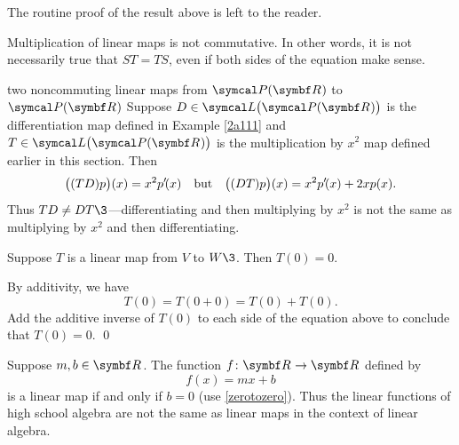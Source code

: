The routine proof of the result above is left to the reader.

Multiplication of linear maps is not commutative.  In other words, it is not
necessarily true that $ST = TS$, even if both sides of the equation make sense.

\begin{example}[3noncom]{two noncommuting linear maps from\/ $\P(\R{})$ to\/ $\P(\R{})$}
Suppose $D \in \L\bigl(\P(\R{})\bigr)$ is the differentiation map defined
in Example \ref{2a111} and $T \in \L\bigl(\P(\R{})\bigr)$ is the multiplication by
$x^2$ map defined earlier in this section. Then
\[
\bigl((TD)p\bigr)(x) = x^2 p' \! (x) \quad \text{but} \quad \bigl((DT)p\bigr)(x) = x^2 p' \! (x) + 2 x p(x).
\]
Thus $TD \ne DT\3$---differentiating and then multiplying by $x^2$ is not the same as multiplying by $x^2$ and then differentiating.
\end{example}

{Suppose $T$ is a linear map from $V$ to $W\3$. Then $T(0) = 0$.}

\proof
By additivity, we have
\[
T(0) = T(0 + 0) = T(0) + T(0).
\]
Add the additive inverse of $T(0)$ to each side of the equation above to conclude that $T(0) = 0$.
\qed

Suppose $m, b \in \R{}$. The function $\fun f {\R{}} {\R{}}$ defined by
\[
f(x) = mx + b
\]
is a linear map if and only if $b = 0$ (use \ref{zerotozero}). Thus the linear functions of high school algebra are not the same as linear maps in the context of linear algebra.

\pagebreak[3]

